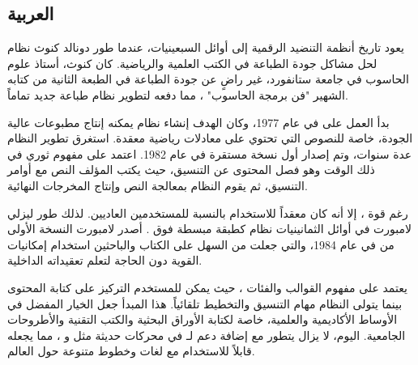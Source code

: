 \documentclass[a4paper,12pt]{article}
\begin{document}
\begin{Arabic}
\section{العربية}
  يعود تاريخ أنظمة التنضيد الرقمية إلى أوائل السبعينيات، عندما طور دونالد كنوث  نظام  لحل مشاكل جودة الطباعة في الكتب العلمية والرياضية. كان كنوث، أستاذ علوم الحاسوب في جامعة ستانفورد، غير راضٍ عن جودة الطباعة في الطبعة الثانية من كتابه الشهير "فن برمجة الحاسوب" ، مما دفعه لتطوير نظام طباعة جديد تماماً.
  
  بدأ العمل على  في عام 1977، وكان الهدف إنشاء نظام يمكنه إنتاج مطبوعات عالية الجودة، خاصة للنصوص التي تحتوي على معادلات رياضية معقدة. استغرق تطوير النظام عدة سنوات، وتم إصدار أول نسخة مستقرة في عام 1982. اعتمد  على مفهوم ثوري في ذلك الوقت وهو فصل المحتوى عن التنسيق، حيث يكتب المؤلف النص مع أوامر التنسيق، ثم يقوم النظام بمعالجة النص وإنتاج المخرجات النهائية.
  
  رغم قوة ، إلا أنه كان معقداً للاستخدام بالنسبة للمستخدمين العاديين. لذلك طور ليزلي لامبورت  في أوائل الثمانينيات نظام  كطبقة مبسطة فوق . أصدر لامبورت النسخة الأولى من  في عام 1984، والتي جعلت من السهل على الكتاب والباحثين استخدام إمكانيات  القوية دون الحاجة لتعلم تعقيداته الداخلية.
  
  يعتمد  على مفهوم القوالب والفئات ، حيث يمكن للمستخدم التركيز على كتابة المحتوى بينما يتولى النظام مهام التنسيق والتخطيط تلقائياً. هذا المبدأ جعل  الخيار المفضل في الأوساط الأكاديمية والعلمية، خاصة لكتابة الأوراق البحثية والكتب التقنية والأطروحات الجامعية. اليوم، لا يزال  يتطور مع إضافة دعم لـ  في محركات حديثة مثل  و ، مما يجعله قابلاً للاستخدام مع لغات وخطوط متنوعة حول العالم.
\end{Arabic}
  
\end{document}
